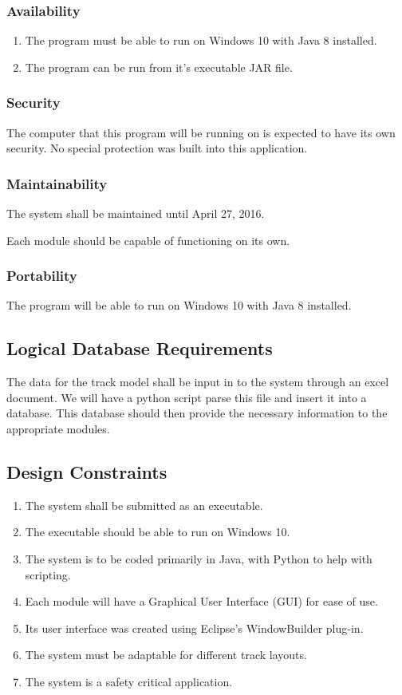 \documentclass[11pt]{article}
\begin{document}
\subsubsection{Availability}
\label{sec-3-2-3}
\begin{enumerate}
\item The program must be able to run on Windows 10 with Java 8 installed.
\item The program can be run from it's executable JAR file.
\end{enumerate}
\subsubsection{Security}
\label{sec-3-2-4}
The computer that this program will be running on is expected to have its own security. No special protection was built into this application.

\subsubsection{Maintainability}
\label{sec-3-2-5}
The system shall be maintained until April 27, 2016.

Each module should be capable of functioning on its own.
\subsubsection{Portability}
\label{sec-3-2-6}
The program will be able to run on Windows 10 with Java 8 installed.
\subsection{Logical Database Requirements}
\label{sec-3-3}
The data for the track model shall be input in to the system through an excel document. We will have a python script parse this file and insert it into a database. This database should then provide the necessary information to the appropriate modules.
\subsection{Design Constraints}
\label{sec-3-4}

\begin{enumerate}
\item The system shall be submitted as an executable.
\item The executable should be able to run on Windows 10.
\item The system is to be coded primarily in Java, with Python to help with scripting.
\item Each module will have a Graphical User Interface (GUI) for ease of use.
\item Its user interface was created using Eclipse's WindowBuilder plug-in.
\item The system must be adaptable for different track layouts.
\item The system is a safety critical application.
\end{enumerate}
\end{document}
